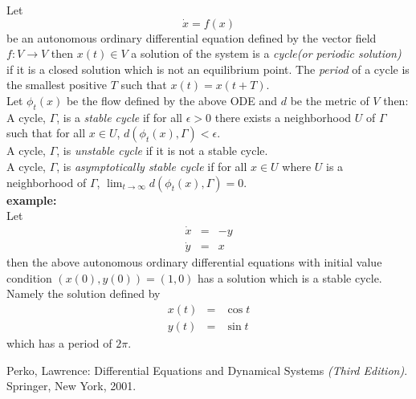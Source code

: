 \documentclass[12pt]{article}
\begin{document}

Let 
$$\dot{x}=f(x)$$
be an autonomous ordinary differential equation defined by the vector field $f\colon V \to V$ then $x(t)\in V$ a solution of the system is a \emph{cycle}\textit{(or \emph{periodic solution})} if it is a closed solution which is not an equilibrium point.  The \emph{period} of a cycle is the smallest positive $T$ such that $x(t)=x(t+T)$.\\
Let $\phi_t(x)$ be the flow defined by the above ODE and $d$ be the metric of $V$ then:\\
A cycle, $\Gamma$, is a \emph{stable cycle} if for all $\epsilon>0$ there exists a neighborhood $U$ of $\Gamma$ such that for all $x\in U$, $d(\phi_t(x),\Gamma)< \epsilon$.\\
A cycle, $\Gamma$, is \emph{unstable cycle} if it is not a stable cycle.\\
A cycle, $\Gamma$, is \emph{asymptotically stable cycle} if for all $x\in U$ where $U$ is a neighborhood of $\Gamma$, $\lim_{t\to\infty}d(\phi_t(x),\Gamma)=0$.\cite{PL}\\

\textbf{example:}\\
Let
\begin{eqnarray*}
\dot{x} & = & -y\\
\dot{y} & = & x
\end{eqnarray*}
then the above autonomous ordinary differential equations with initial value condition $(x(0),y(0))=(1,0)$ has a solution which is a stable cycle.  Namely the solution defined by
\begin{eqnarray*}
x(t) & = & \cos t\\
y(t) & = & \sin t
\end{eqnarray*}
which has a period of $2\pi$.

\begin{thebibliography}{2}
 Perko, Lawrence: Differential Equations and Dynamical Systems \textit{(Third Edition)}. Springer, New York, 2001.
\end{thebibliography}
\end{document}
